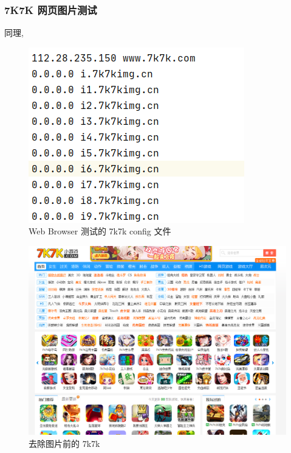 \documentclass[UTF8]{article}
\begin{document}
\subsubsection{7K7K 网页图片测试}
同理, 
\begin{figure}[H]
	\centering
	\includegraphics[width=\linewidth/3]{7k7k_config.png}
	\caption{Web Browser 测试的 7k7k config 文件}
\end{figure}\par
\begin{figure}[H]
	\centering
	\includegraphics[width=\linewidth/3*2]{7k7k.png}
	\caption{去除图片前的 7k7k}
\end{figure}\par
\end{document}
